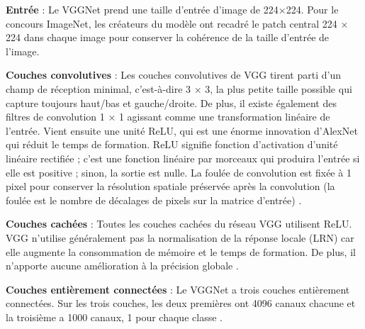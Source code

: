 	
	\begin{list}{--}{Un bref coup d'œil à l'architecture de VGG :}
		\item \textbf{Entrée} : Le VGGNet prend une taille d'entrée d'image de 224×224. Pour le concours ImageNet, les créateurs du modèle ont recadré le patch central 224 × 224 dans chaque image pour conserver la cohérence de la taille d'entrée de l'image\cite{simonyan2014very}.
		
		\item \textbf{Couches convolutives }: Les couches convolutives de VGG tirent parti d'un champ de réception minimal, c'est-à-dire 3 × 3, la plus petite taille possible qui capture toujours haut/bas et gauche/droite. De plus, il existe également des filtres de convolution 1 × 1 agissant comme une transformation linéaire de l'entrée. Vient ensuite une unité ReLU, qui est une énorme innovation d'AlexNet qui réduit le temps de formation. ReLU signifie fonction d'activation d'unité linéaire rectifiée ; c'est une fonction linéaire par morceaux qui produira l'entrée si elle est positive ; sinon, la sortie est nulle. La foulée de convolution est fixée à 1 pixel pour conserver la résolution spatiale préservée après la convolution (la foulée est le nombre de décalages de pixels sur la matrice d'entrée)   \cite{tammina2019transfer}.
		
		\item \textbf{Couches cachées} : Toutes les couches cachées du réseau VGG utilisent ReLU. VGG n'utilise généralement pas la normalisation de la réponse locale (LRN) car elle augmente la consommation de mémoire et le temps de formation. De plus, il n'apporte aucune amélioration à la précision globale \cite{tammina2019transfer}.
		
		\item \textbf{Couches entièrement connectées} : Le VGGNet a trois couches entièrement connectées. Sur les trois couches, les deux premières ont 4096 canaux chacune et la troisième a 1000 canaux, 1 pour chaque classe \cite{tammina2019transfer}.
	
	\end{list}
	

